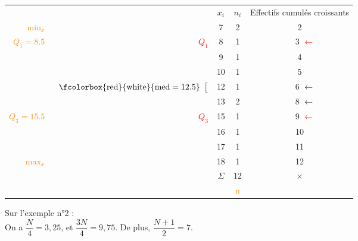 \begin{tabular}{rrc|c|c}
& & $x_i$ & $n_i$ & Effectifs cumulés croissants \\
\cline{3-5}
\textcolor{DarkOrange}{$\mathrm{min}_{x}$}&   & 7 & 2 & 2 \\
\textcolor{DarkOrange}{$Q_1 = 8.5$}& \textcolor{Red}{$Q_1$}
    & 8 & 1 & $\quad$ 3 \textcolor{red}{$\leftarrow$}\\
& & 9 & 1 & 4 \\
& & 10 & 1 & 5 \\
& \multirow{2}{2cm}{{\color{VertClair}
 $\left. \begin{array}{c}
          \mathrm{\fcolorbox{red}{white}{med=12.5}}\\
          \end{array}
  \right[$
 } }                  & 12 & 1 
           & $\quad$ 6 \textcolor{VertClair}{$\leftarrow$} \\
& & 13 & 2 & $\quad$ 8 \textcolor{VertClair}{$\leftarrow$}  \\
\textcolor{DarkOrange}{$Q_3 = 15.5$}
    &  \textcolor{Red}{$Q_3$}& 15 & 1 & $\quad$ 9 \textcolor{red}{$\leftarrow$} \\
& & 16 & 1 & 10 \\
& & 17 & 1 & 11 \\
\textcolor{DarkOrange}{$\mathrm{max}_x$}& & 18 & 1 & 12 \\
\cline{3-5}
& &  $\Sigma$ & 12 & {\Large $\times$} \\
& &  &\textcolor{DarkOrange}{n}& \\
\end{tabular}

\vspace*{.5cm}

Sur l'exemple n°2 : \\

On a $\dfrac{N}{4} = 3,25$, et $\dfrac{3N}{4} = 9,75$. De plus, $\dfrac{N+1}{2} = 7$.

